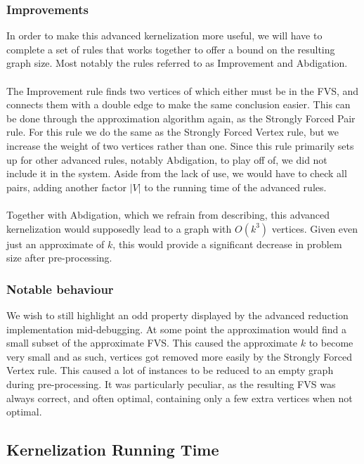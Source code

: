 \subsubsection{Improvements}
In order to make this advanced kernelization more useful, we will have to complete a set of rules that works together to offer a bound on the resulting graph size. Most notably the rules referred to as Improvement and Abdigation. \\\\
The Improvement rule finds two vertices of which either must be in the FVS, and connects them with a double edge to make the same conclusion easier. This can be done through the approximation algorithm again, as the Strongly Forced Pair rule. For this rule we do the same as the Strongly Forced Vertex rule, but we increase the weight of two vertices rather than one. Since this rule primarily sets up for other advanced rules, notably Abdigation, to play off of, we did not include it in the system. Aside from the lack of use, we would have to check all pairs, adding another factor $|V|$ to the running time of the advanced rules.\\\\
Together with Abdigation, which we refrain from describing, this advanced kernelization would supposedly lead to a graph with $O(k^3)$ vertices. Given even just an approximate of $k$, this would provide a significant decrease in problem size after pre-processing.
\subsubsection{Notable behaviour}
We wish to still highlight an odd property displayed by the advanced reduction implementation mid-debugging. At some point the approximation would find a small subset of the approximate FVS. This caused the approximate $k$ to become very small and as such, vertices got removed more easily by the Strongly Forced Vertex rule. This caused a lot of instances to be reduced to an empty graph during pre-processing. It was particularly peculiar, as the resulting FVS was always correct, and often optimal, containing only a few extra vertices when not optimal.

\subsection{Kernelization Running Time} %

